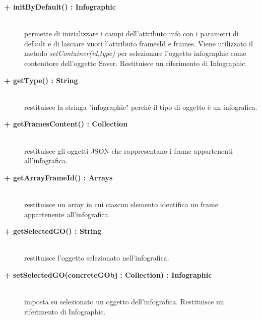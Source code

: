 \begin{description}
\begin{description}
\end{description}

\begin{description}
		\item[\textbf{\color{blue}+ initByDefault() : Infographic			}] \hfill \\
			permette di inizializzare i campi dell'attributo info con i parametri di default e di lasciare vuoti l'attributo framesId e frames. Viene utilizzato il metodo \textit{setContainer(id,type)} per selezionare l'oggetto infographic come contenitore dell'oggetto Saver. Restituisce un riferimento di Infographic.

\end{description}

\begin{description}
		\item[\textbf{\color{blue}+ getType() : String			}] \hfill \\
			restituisce la stringa "infographic" perchè il tipo di oggetto è un infografica.

\end{description}

\begin{description}
		\item[\textbf{\color{blue}+ getFramesContent() : Collection			}] \hfill \\
			restituisce gli oggetti JSON che rappresentano i frame appartenenti all'infografica.

\end{description}

\begin{description}
		\item[\textbf{\color{blue}+ getArrayFrameId() : Arrays			}] \hfill \\
			restituisce un array in cui ciascun elemento identifica un frame appartenente all'infografica.

\end{description}

\begin{description}
		\item[\textbf{\color{blue}+ getSelectedGO() : String			}] \hfill \\
			restituisce l'oggetto selezionato nell'infografica.

\end{description}

\begin{description}
		\item[\textbf{\color{blue}+ setSelectedGO(concreteGObj : Collection) : Infographic			}] \hfill \\
			imposta su selezionato un oggetto dell'infografica. Restituisce un riferimento di Infographic.


\end{description}
\end{description}
